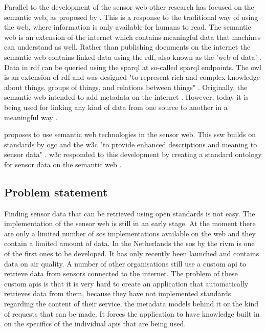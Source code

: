 Parallel to the development of the sensor web other research has focused on the semantic web, as proposed by \cite{LD:Berners-lee}. This is a response to the traditional way of using the web, where information is only available for humans to read. The semantic web is an extension of the internet which contains meaningful data that machines can understand as well. Rather than publishing documents on the internet the semantic web contains linked data using the \ac{rdf}, also known as the 'web of data' \citep{LD:Bizer}. Data in \ac{rdf} can be queried using the \ac{sparql} at so-called \ac{sparql} endpoints. The \ac{owl} is an extension of \ac{rdf} and was designed "to represent rich and complex knowledge about things, groups of things, and relations between things" \citep{LD:OWL}. Originally, the semantic web intended to add metadata on the internet \citep{LD:W3C}. However, today it is being used for linking any kind of data from one source to another in a meaningful way \citep{LD:Cambridge}. 

\cite{SSW:Sheth} proposes to use semantic web technologies in the sensor web. This \ac{ssw} builds on standards by \ac{ogc} and the \ac{w3c} "to provide enhanced descriptions and meaning to sensor data" \cite[p. 78]{SSW:Sheth}. \ac{w3c} responded to this development by creating a standard ontology for sensor data on the semantic web \citep{SSW:SSN_incubatorGroup}. 
 
\subsection{Problem statement}
Finding sensor data that can be retrieved using open standards is not easy. The implementation of the sensor web is still in an early stage. At the moment there are only a limited number of \ac{sos} implementations available on the web and they contain a limited amount of data. In the Netherlands the \ac{sos} by the \ac{rivm} is one of the first ones to be developed. It has only recently been launched and contains data on air quality. A number of other organisations still use a custom \ac{api} to retrieve data from sensors connected to the internet. The problem of these custom \ac{api}s is that it is very hard to create an application that automatically retrieves data from them, because they have not implemented standards regarding the content of their service, the metadata models behind it or the kind of requests that can be made. It forces the application to have knowledge built in on the specifics of the individual \ac{api}s that are being used.  

